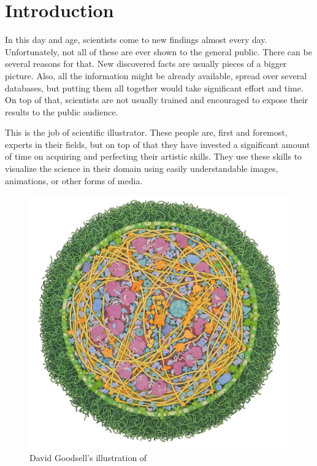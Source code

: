 \documentclass[
  digital, %
  table,   %
  nolof,     %
  nolot,     %
  oneside,
]{fithesis3}
\begin{document}
\chapter{Introduction}
\label{chap:introduction}
In this day and age, scientists come to new findings almost every day. Unfortunately, not all of these are ever shown to the general public. There can be several reasons for that. New discovered facts are usually pieces of a bigger picture. Also, all the information might be already available, spread over several databases, but putting them all together would take significant effort and time.
On top of that, scientists are not usually trained and encouraged to expose their results to the public audience.

This is the job of scientific illustrator. These people are, first and foremost, experts in their fields, but on top of that they have invested a significant amount of time on acquiring and perfecting their artistic skills. They use these skills to visualize the science in their domain using easily understandable images, animations, or other forms of media. %
\begin{figure}
  \centering
  \includegraphics[scale=0.4]{images/goodsell-mycoplasma.jpg}
  \caption{David Goodsell's illustration of}
  \label{fig:goodsell-mycoplasma}
\end{figure}
\end{document}

